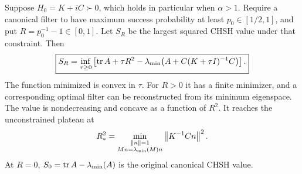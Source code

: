 \begin{theorem}
\label{thm:ext-success-dual}
Suppose $H_0=K+iC\succ0$, which holds in particular when $\alpha>1$.
Require a canonical filter to have maximum success probability at least
$p_0\in[1/2,1]$, and put
$R=p_0^{-1}-1\in[0,1]$.
Let $S_R$ be the largest squared CHSH value under that constraint.
Then
\begin{equation}
 \boxed{
 S_R=\inf_{\tau\ge0}
 \left[
 \operatorname{tr} A+\tau R^2
 -\lambda_{\min}\!\left(A+C(K+\tau I)^{-1}C\right)
 \right].
 }
 \label{eq:ext-success-dual}
\end{equation}
The function minimized is convex in $\tau$.
For $R>0$ it has a finite minimizer, and a corresponding optimal
filter can be reconstructed from its minimum eigenspace.
The value is nondecreasing and concave as a function of $R^2$.
It reaches the unconstrained plateau at
\begin{equation}
 R_*^2=
 \min_{\substack{\left\lVert n\right\rVert=1\\Mn=\lambda_{\min}(M)n}}
       \left\lVert K^{-1}Cn\right\rVert^2.
 \label{eq:ext-plateau-radius}
\end{equation}
At $R=0$, $S_0=\operatorname{tr} A-\lambda_{\min}(A)$ is the original canonical
CHSH value.
\end{theorem}


